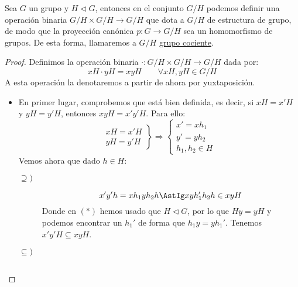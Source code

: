 \begin{teo}\label{teo:grupo_cociente}
    Sea $G$ un grupo y $H\lhd G$, entonces en el conjunto $G/H$ podemos definir una operación binaria $G/H\times G/H\longrightarrow G/H$ que dota a $G/H$ de estructura de grupo, de modo que la proyección canónica $p:G\to G/H$ sea un homomorfismo de grupos. De esta forma, llamaremos a $G/H$ \underline{grupo cociente}.
    \begin{proof}
        Definimos la operación binaria $\cdot: G/H\times G/H\longrightarrow G/H$ dada por:
        \begin{equation*}
            xH\cdot yH = xyH \qquad \forall xH,yH\in G/H
        \end{equation*}
        A esta operación la denotaremos a partir de ahora por yuxtaposición.
        \begin{itemize}
            \item En primer lugar, comprobemos que está bien definida, es decir, si $xH = x'H$ y $yH=y'H$, entonces $xyH = x'y'H$. Para ello:
                \begin{equation*}
                    \left.\begin{array}{l}
                        xH = x'H \\
                        yH = y'H
                    \end{array}\right\} \Longrightarrow \left\{\begin{array}{l}
                        x'= xh_1 \\
                        y' = yh_2 \\
                        h_1,h_2\in H
                    \end{array}\right.
                \end{equation*}
                Vemos ahora que dado $h\in H$:
                \begin{description}
                    \item [$\supseteq)$] 
                        \begin{equation*}
                            x'y'h = xh_1yh_2h \AstIg xyh_1'h_2h \in xyH
                        \end{equation*}
                        Donde en $(\ast)$ hemos usado que $H\lhd G$, por lo que $Hy=yH$ y podemos encontrar un $h_1'$ de forma que $h_1y = yh_1'$. Tenemos $x'y'H\subseteq xyH$. 
                    \item [$\subseteq)$] 
                        \begin{equation*}

\end{equation*}
\end{description}
\end{itemize}
\end{proof}
\end{teo}
